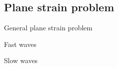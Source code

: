 \subsection{Plane strain problem}
\begin{frame}{General plane strain problem}
  \begin{block}{Fast waves}
    \vspace{-0.5cm}
    \centering
    
  \end{block}\pause
  \begin{block}{Slow waves}
    \vspace{-0.5cm}
    \centering
    
  \end{block}
   
\end{frame}


